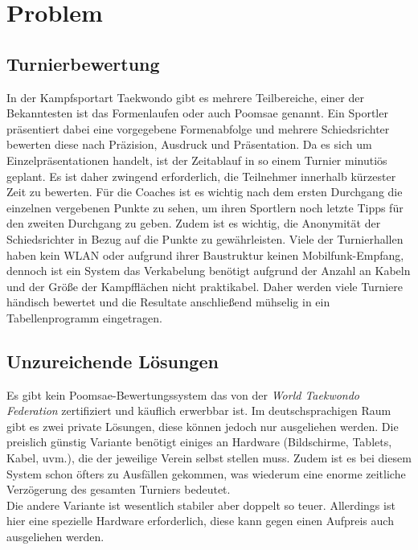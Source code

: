 \section{Problem}

\subsection{Turnierbewertung}
In der Kampfsportart Taekwondo gibt es mehrere Teilbereiche, einer der Bekanntesten ist das Formenlaufen oder auch Poomsae genannt.
Ein Sportler präsentiert dabei eine vorgegebene Formenabfolge und mehrere Schiedsrichter bewerten diese nach
Präzision, Ausdruck und Präsentation.
Da es sich um Einzelpräsentationen handelt, ist der Zeitablauf in so einem Turnier minutiös geplant.
Es ist daher zwingend erforderlich, die Teilnehmer innerhalb kürzester Zeit zu bewerten.
Für die Coaches ist es wichtig nach dem ersten Durchgang die einzelnen vergebenen Punkte zu sehen, um ihren Sportlern
    noch letzte Tipps für den zweiten Durchgang zu geben.
Zudem ist es wichtig, die Anonymität der Schiedsrichter in Bezug auf die Punkte zu gewährleisten.
Viele der Turnierhallen haben kein WLAN oder aufgrund ihrer Baustruktur keinen Mobilfunk-Empfang, dennoch ist ein System
das Verkabelung benötigt aufgrund der Anzahl an Kabeln und der Größe der Kampfflächen nicht praktikabel.
Daher werden viele Turniere händisch bewertet und die Resultate anschließend mühselig in ein Tabellenprogramm eingetragen.
	
\subsection{Unzureichende Lösungen}

Es gibt kein Poomsae-Bewertungssystem das von der \emph{World Taekwondo Federation} zertifiziert und käuflich erwerbbar ist.
Im deutschsprachigen Raum gibt es zwei private Lösungen, diese können jedoch nur ausgeliehen werden.
Die preislich günstig Variante benötigt einiges an Hardware (Bildschirme, Tablets, Kabel, uvm.), die der jeweilige Verein selbst stellen muss.
Zudem ist es bei diesem System schon öfters zu Ausfällen gekommen, was wiederum eine enorme zeitliche
Verzögerung des gesamten Turniers bedeutet.
\\
Die andere Variante ist wesentlich stabiler aber doppelt so teuer.
Allerdings ist hier eine spezielle Hardware erforderlich, diese kann gegen einen Aufpreis auch ausgeliehen werden.


